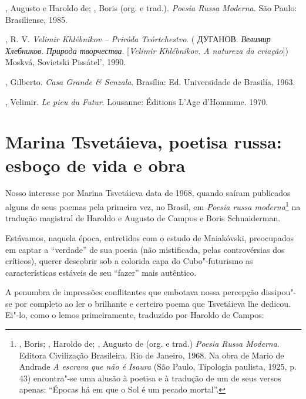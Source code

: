 , Augusto e Haroldo de; , Boris (org. e trad.).
\emph{Poesia Russa Moderna}. São Paulo: Brasiliense, 1985.

, R. V. \emph{Velimir Khlébnikov -- Priróda Tvórtchestvo}. (
ДУГАНОВ. \emph{Велимир Хлебников}. \emph{Природа творчества}.
[\emph{Velimir Khlébnikov. A natureza da criação}]) Moskvá,
Sovietski Pissátel', 1990.

, Gilberto. \emph{Casa Grande \& Senzala}. Brasília: Ed.
Universidade de Brasilía, 1963.

, Velimir. \emph{Le pieu du Futur}. Lousanne: Éditions L'Age
d'Hommme. 1970.

\chapter{Marina Tsvetáieva, poetisa russa: esboço de vida e
obra}


Nosso interesse por Marina Tsvetáieva data de 1968, quando saíram
publicados alguns de seus poemas pela primeira vez, no Brasil, em
\emph{Poesia russa moderna}\footnote{, Boris; ,
  Haroldo de; , Augusto de (org. e trad.) \emph{Poesia Russa Moderna}.
  Editora Civilização Brasileira. Rio de Janeiro, 1968. Na obra de Mario
  de Andrade \emph{A escrava que não é Isaura} (São Paulo, Tipologia
  paulista, 1925, p. 43) encontra"-se uma alusão à poetisa e à tradução
  de um de seus versos apenas: ``Épocas há em que o Sol é um pecado
  mortal''.} na tradução magistral de Haroldo e Augusto de Campos e
Boris Schnaiderman.

Estávamos, naquela época, entretidos com o estudo de Maiakóvski,
preocupados em captar a ``verdade'' de sua poesia (não mistificada,
pelas controvérsias dos críticos), querer descobrir sob a colorida capa
do Cubo"-futurismo as características estáveis de seu ``fazer'' mais
autêntico.

A penumbra de impressões conflitantes que embotava nossa percepção
dissipou"-se por completo ao ler o brilhante e certeiro poema que
Tsvetáieva lhe dedicou. Ei"-lo, como o lemos primeiramente, traduzido por
Haroldo de Campos:

